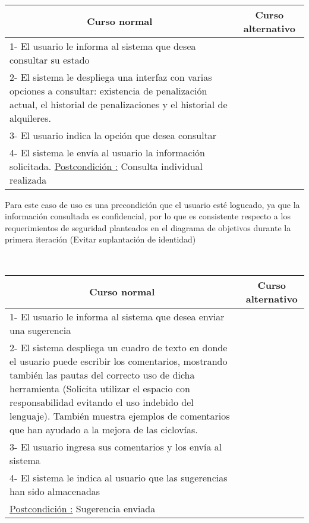 ~

\begin{center}
    \centering
    \begin{tabular}{ | p{11cm} | p{6cm} | }
    	\multicolumn{1}{c}{\cellcolor{black!30}\textbf{Curso normal}} & 
    	\multicolumn{1}{c}{\cellcolor{black!30}\textbf{Curso alternativo}} \\
		\hline
		1- El usuario le informa al sistema que desea consultar su estado & \\ \hline
		2- El sistema le despliega una interfaz con varias opciones a consultar:
		existencia de penalización actual, el historial de 
		penalizaciones y el historial de alquileres. & \\ \hline
		3- El usuario indica la opción que desea consultar & \\ \hline
		4- El sistema le envía al usuario la información solicitada.
		\underline{Postcondición :} Consulta individual realizada & \\ \hline
    \end{tabular}
\end{center}

Para este caso de uso es una precondición que el usuario esté logueado, ya que la información consultada es confidencial, por
lo que es consistente respecto a los requerimientos de seguridad planteados en el diagrama de objetivos durante la primera 
iteración (Evitar suplantación de identidad)

~

\begin{center}
    \centering
    \begin{tabular}{ | p{11cm} | p{6cm} | }
    	\multicolumn{1}{c}{\cellcolor{black!30}\textbf{Curso normal}} & 
    	\multicolumn{1}{c}{\cellcolor{black!30}\textbf{Curso alternativo}} \\
		\hline
		1- El usuario le informa al sistema que desea enviar una sugerencia & \\ \hline
		2- El sistema despliega un cuadro de texto en donde el usuario puede escribir los comentarios,
		mostrando también las pautas del correcto uso de dicha herramienta (Solicita
		utilizar el espacio con
		responsabilidad evitando el uso indebido del lenguaje).
		También muestra ejemplos de comentarios que han ayudado a la mejora de las ciclovías. & \\ \hline
		3- El usuario ingresa sus comentarios y los envía al sistema & \\ \hline
		4- El sistema le indica al usuario que las sugerencias han sido almacenadas & \\ \hline
		\underline{Postcondición :} Sugerencia enviada & \\ \hline
    \end{tabular}
\end{center}





